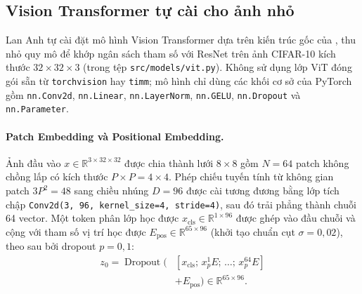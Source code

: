\subsection{Vision Transformer tự cài cho ảnh nhỏ}
Lan Anh tự cài đặt mô hình Vision Transformer dựa trên kiến trúc gốc của \citet{dosovitskiy2020image}, thu nhỏ quy mô để khớp ngân sách tham số với ResNet trên ảnh CIFAR-10 kích thước $32\times32\times3$ (trong tệp \texttt{src/models/vit.py}). Không sử dụng lớp ViT đóng gói sẵn từ \texttt{torchvision} hay \texttt{timm}; mô hình chỉ dùng các khối cơ sở của PyTorch gồm \texttt{nn.Conv2d}, \texttt{nn.Linear}, \texttt{nn.LayerNorm}, \texttt{nn.GELU}, \texttt{nn.Dropout} và \texttt{nn.Parameter}.

\paragraph{Patch Embedding và Positional Embedding.}
Ảnh đầu vào $x\in\mathbb{R}^{3\times32\times32}$ được chia thành lưới $8\times8$ gồm $N=64$ patch không chồng lấp có kích thước $P\times P=4\times4$. Phép chiếu tuyến tính từ không gian patch $3P^2=48$ sang chiều nhúng $D=96$ được cài tương đương bằng lớp tích chập \texttt{Conv2d(3, 96, kernel\_size=4, stride=4)}, sau đó trải phẳng thành chuỗi 64 vector. Một token phân lớp học được $x_{\text{cls}}\in\mathbb{R}^{1\times96}$ được ghép vào đầu chuỗi và cộng với tham số vị trí học được $E_{\text{pos}}\in\mathbb{R}^{65\times96}$ (khởi tạo chuẩn cụt $\sigma=0{,}02$), theo sau bởi dropout $p=0{,}1$:
\[
\begin{aligned}
z_0 = \operatorname{Dropout}\!\Big(&[x_{\text{cls}};\, x_p^1 E;\, \dots;\, x_p^{64} E]\\[-2pt]
&+ E_{\text{pos}}\Big) \in \mathbb{R}^{65\times96}.
\end{aligned}
\]

